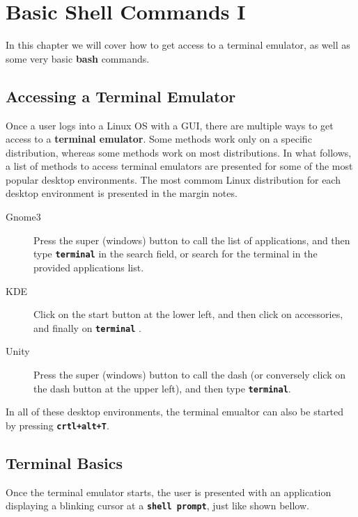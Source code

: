 \chapter{Basic Shell Commands I}\label{ch:basic_commands}

In this chapter we will cover how to get access to a terminal emulator, as well as some very basic \textbf{bash} commands.

\section{Accessing a Terminal Emulator}

Once a user logs into a Linux \acs{OS} with a \acs{GUI}, there are multiple ways to get access to a \textbf{terminal emulator}. Some methods work only on a specific distribution, whereas some methods work on most distributions. In what follows, a list of methods to access terminal emulators are presented for some of the most popular desktop environments. The most commom Linux distribution for each desktop environment is presented in the margin notes.

\begin{description}
   \item[Gnome3] Press the super (windows) button to call the list of applications, and then type \textbf{\texttt{terminal}} in the search field, or search for the terminal in the provided applications list.
   \item[KDE] Click  on the start button at the lower left, and then click on accessories, and finally on \textbf{\texttt{terminal}} .
   \item[Unity] Press the super (windows) button to call the dash (or conversely click on the dash button at the upper left), and then type \textbf{\texttt{terminal}}.
\end{description}

In all of these desktop environments, the terminal emualtor can also be started by pressing \textbf{\texttt{crtl+alt+T}}.

\section{Terminal Basics}

Once the terminal emulator starts, the user is presented with an application displaying a blinking cursor at a \textbf{\texttt{shell prompt}}, just like shown bellow.

